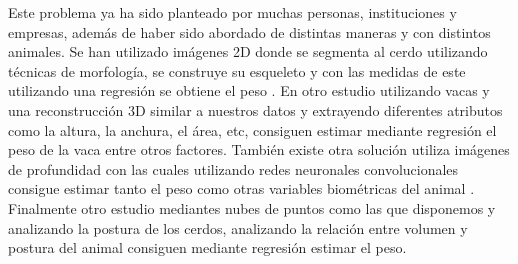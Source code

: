 \documentclass[12pt,a4paper]{article}
\begin{document}
Este problema ya ha sido planteado por muchas personas, instituciones y empresas, además de haber sido abordado de distintas maneras y con distintos animales. Se han utilizado imágenes 2D donde se segmenta al cerdo utilizando técnicas de morfología, se construye su esqueleto y con las medidas de este utilizando una regresión se obtiene el peso \cite{Area}. En otro estudio utilizando vacas y una reconstrucción 3D similar a nuestros datos y extrayendo diferentes atributos como la altura, la anchura, el área, etc, consiguen estimar mediante regresión el peso de la vaca entre otros factores\cite{3D}.
También existe otra solución utiliza imágenes de profundidad con las cuales utilizando redes neuronales convolucionales consigue estimar tanto el peso como otras variables biométricas del animal \cite{CNN}.
Finalmente otro estudio mediantes nubes de puntos como las que disponemos y analizando la postura de los cerdos, analizando la relación entre volumen y postura del animal consiguen mediante regresión estimar el peso.
\end{document}
